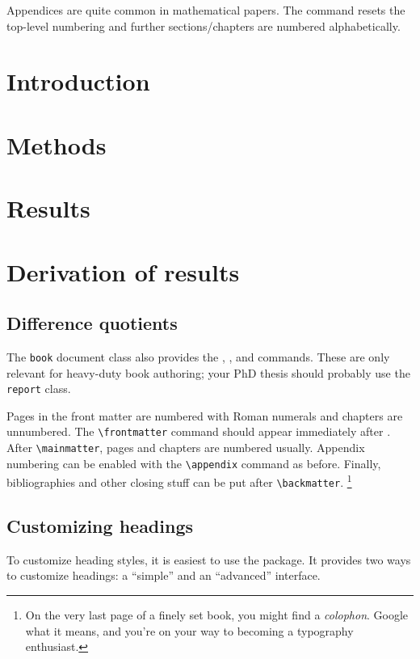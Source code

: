 Appendices are quite common in mathematical papers.
The  command resets the top-level numbering
and further sections/chapters are numbered alphabetically.

\begin{ExampleCode}
\section{Introduction} %
\section{Methods} %
\section{Results} %

\appendix

\section{Derivation of results} %
\subsection{Difference quotients} %
\end{ExampleCode}

The \verb|book| document class also provides the
, , and  commands.
These are only relevant for heavy-duty book authoring;
your PhD thesis should probably use the \verb|report| class.

Pages in the front matter are numbered with Roman numerals
and chapters are unnumbered.
The \verb|\frontmatter| command should appear immediately after \verb||.
After \verb|\mainmatter|, pages and chapters are numbered usually.
Appendix numbering can be enabled with the \verb|\appendix| command as before.
Finally, bibliographies and other closing stuff can be put after \verb|\backmatter|.%
\footnote{On the very last page of a finely set book, you might find a \emph{colophon}.
Google what it means, and you're on your way to becoming a typography enthusiast.}

%
%
\subsection{Customizing headings}

To customize heading styles, it is easiest to use the  package.
It provides two ways to customize headings: a ``simple'' and an ``advanced'' interface.

